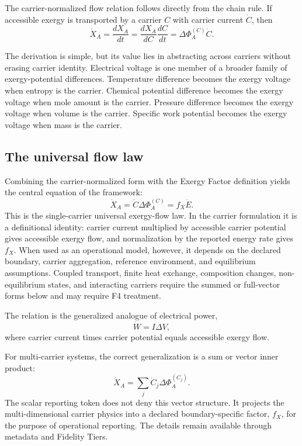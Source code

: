 \documentclass[11pt]{article}
\newcommand{\fx}{f_X}
\newcommand{\XA}{X_A}
\newcommand{\XdotA}{\dot{X}_A}
\begin{document}
The carrier-normalized flow relation follows directly from the chain rule. If accessible exergy is transported by a carrier $C$ with carrier current $\dot{C}$, then
\begin{equation}
\XdotA = \frac{d\XA}{dt}=\frac{d\XA}{dC}\frac{dC}{dt}=\Delta\Phi_A^{(C)}\dot{C}.
\end{equation}

The derivation is simple, but its value lies in abstracting across carriers without erasing carrier identity. Electrical voltage is one member of a broader family of exergy-potential differences. Temperature difference becomes the exergy voltage when entropy is the carrier. Chemical potential difference becomes the exergy voltage when mole amount is the carrier. Pressure difference becomes the exergy voltage when volume is the carrier. Specific work potential becomes the exergy voltage when mass is the carrier.

\subsection{The universal flow law}

Combining the carrier-normalized form with the Exergy Factor definition yields the central equation of the framework:
\begin{equation}
\XdotA = \dot{C}\Delta\Phi_A^{(C)} = \fx\dot{E}.
\end{equation}
This is the single-carrier universal exergy-flow law. In the carrier formulation it is a definitional identity: carrier current multiplied by accessible carrier potential gives accessible exergy flow, and normalization by the reported energy rate gives $\fx$. When used as an operational model, however, it depends on the declared boundary, carrier aggregation, reference environment, and equilibrium assumptions. Coupled transport, finite heat exchange, composition changes, non-equilibrium states, and interacting carriers require the summed or full-vector forms below and may require F4 treatment.

The relation is the generalized analogue of electrical power,
\begin{equation}
\dot{W}=I\Delta V,
\end{equation}
where carrier current times carrier potential equals accessible exergy flow.

For multi-carrier systems, the correct generalization is a sum or vector inner product:
\begin{equation}
\XdotA = \sum_j \dot{C}_j\Delta\Phi_A^{(C_j)}.
\end{equation}
The scalar reporting token does not deny this vector structure. It projects the multi-dimensional carrier physics into a declared boundary-specific factor, $\fx$, for the purpose of operational reporting. The details remain available through metadata and Fidelity Tiers.
\end{document}
